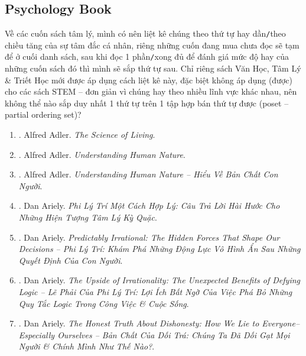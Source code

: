 \documentclass{article}
\begin{document}
\subsection{Psychology Book}
Về các cuốn sách tâm lý, mình có nên liệt kê chúng theo thứ tự hay dần{\tt/}theo chiều tăng của sự tâm đắc cá nhân, riêng những cuốn đang mua chưa đọc sẽ tạm để ở cuối danh sách, sau khi đọc 1 phần{\tt/}xong đủ để đánh giá mức độ hay của những cuốn sách đó thì mình sẽ sắp thứ tự sau. Chỉ riêng sách Văn Học, Tâm Lý \& Triết Học mới được áp dụng cách liệt kê này, đặc biệt không áp dụng (được) cho các sách STEM -- đơn giản vì chúng hay theo nhiều lĩnh vực khác nhau, nên không thể nào sắp duy nhất 1 thứ tự trên 1 tập hợp bán thứ tự được (poset -- partial ordering set)?
\begin{enumerate}
	\item \cite{Adler_science_living}. Alfred Adler. {\it The Science of Living}.\hfill{\sf[done]}

	\item \cite{Adler_human_nature}. {\sc Alfred Adler}. {\it Understanding Human Nature}.\hfill{\sf[done]}

	\item \cite{Adler_human_nature_VN}. {\sc Alfred Adler}. {\it Understanding Human Nature -- Hiểu Về Bản Chất Con Người}.\hfill{\sf[done]}

	\item \cite{Ariely_reasonably_irrational}. Dan Ariely. {\it Phi Lý Trí Một Cách Hợp Lý: Câu Trả Lời Hài Hước Cho Những Hiện Tượng Tâm Lý Kỳ Quặc}.\hfill{\sf[done]}

	\item \cite{Ariely_predictably_irrational}. Dan Ariely. {\it Predictably Irrational: The Hidden Forces That Shape Our Decisions -- Phi Lý Trí: Khám Phá Những Động Lực Vô Hình Ẩn Sau Những Quyết Định Của Con Người}.\hfill{\sf[done]}

	\item \cite{Ariely_upside_rationality}. Dan Ariely. {\it The Upside of Irrationality: The Unexpected Benefits of Defying Logic -- Lẽ Phải Của Phi Lý Trí: Lợi Ích Bất Ngờ Của Việc Phá Bỏ Những Quy Tắc Logic Trong Công Việc \& Cuộc Sống}.\hfill{\sf[done]}

	\item \cite{Ariely_dishonesty}. Dan Ariely. {\it The Honest Truth About Dishonesty: How We Lie to Everyone--Especially Ourselves -- Bản Chất Của Dối Trá: Chúng Ta Đã Dối Gạt Mọi Người \& Chính Mình Như Thế Nào?}.\hfill{\sf[done]}


\end{enumerate}
\end{document}
